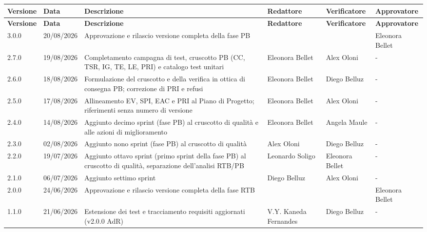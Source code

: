\documentclass[a4paper,12pt]{article}
\begin{document}
\renewcommand{\arraystretch}{1.35}
\begin{center}
    {\footnotesize
    \begin{longtable}{|p{1.4cm}|p{1.8cm}|p{5cm}|p{2.4cm}|p{2.3cm}|p{2.3cm}|}
        \hline
        \rowcolor{gray!20}
        \textbf{Versione} & \textbf{Data} & \textbf{Descrizione} & \textbf{Redattore} & \textbf{Verificatore} & \textbf{Approvatore} \\
        \hline
        \endfirsthead
        \hline
        \rowcolor{gray!20}
        \textbf{Versione} & \textbf{Data} & \textbf{Descrizione} & \textbf{Redattore} & \textbf{Verificatore} & \textbf{Approvatore} \\
        \hline
        \endhead

        \hline
        3.0.0 & 20/08/2026 & Approvazione e rilascio versione completa della fase PB &  &  & Eleonora Bellet \\
        \hline
        2.7.0 & 19/08/2026 & Completamento campagna di test, cruscotto PB (CC, TSR, IG, TE, LE, PRI) e catalogo test unitari & Eleonora Bellet & Alex Oloni & - \\
        \hline
        2.6.0 & 18/08/2026 & Formulazione del cruscotto e della verifica in ottica di consegna PB; correzione di PRI e refusi & Eleonora Bellet & Diego Belluz & - \\
        \hline
        2.5.0 & 17/08/2026 & Allineamento EV, SPI, EAC e PRI al Piano di Progetto; riferimenti senza numero di versione & Eleonora Bellet & Alex Oloni & - \\
        \hline
        2.4.0 & 14/08/2026 & Aggiunto decimo sprint (fase PB) al cruscotto di qualità e alle azioni di miglioramento & Eleonora Bellet & Angela Maule & - \\
        \hline
        2.3.0 & 02/08/2026 & Aggiunto nono sprint (fase PB) al cruscotto di qualità & Alex Oloni & Diego Belluz & - \\
        \hline
        2.2.0 & 19/07/2026 & Aggiunto ottavo sprint (primo sprint della fase PB) al cruscotto di qualità, separazione dell'analisi RTB/PB & Leonardo Soligo & Eleonora Bellet & - \\
        \hline
        2.1.0 & 06/07/2026 & Aggiunto settimo sprint & Diego Belluz & Alex Oloni & - \\
        \hline
        2.0.0 & 24/06/2026 & Approvazione e rilascio versione completa della fase RTB &  &  & Eleonora Bellet \\
        \hline
        1.1.0 & 21/06/2026 & Estensione dei test e tracciamento requisiti aggiornati (v2.0.0 AdR) & V.Y. Kaneda Fernandes & Diego Belluz & - \\

\end{longtable}}
\end{center}
\end{document}
